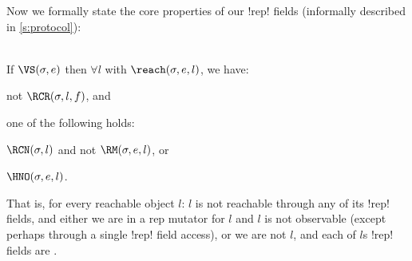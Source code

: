 \LS 

\noindent Now we formally state the core properties of our \Q!rep! fields (informally described in \autoref{s:protocol}):%
\SS\begin{theorem}\ \\
	\indent If $\VS(\s, e)$ then $\forall l$ with $\reach(\s, e, l)$, we have:
	\begin{iitemize}
		\item not $\RCR(\s, l, f)$, and\SS
		\item one of the following holds:
		\begin{iitemize}
			\item $\RCN(\s, l)$ and not $\RM(\s, e, l)$, or\SS[0.15]
			\item $\HNO(\s, e, l)$.
		\end{iitemize}
	\end{iitemize}
\end{theorem}
\SS\noindent That is, for every reachable object $l$: 
	$l$ is not reachable through any of its \Q!rep! fields, 
	and either we are in a rep mutator for $l$ and $l$ is not observable (except perhaps through a single \Q!rep! field access),
	or we are not \RM $l$, and each of $l$s \Q!rep! fields are \CN.
